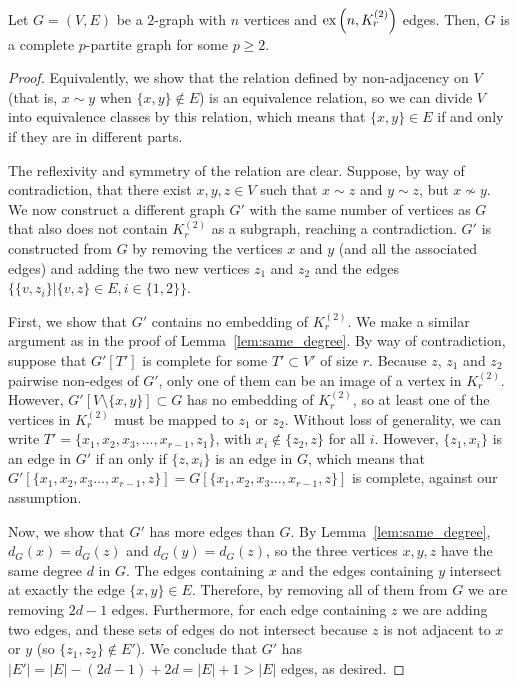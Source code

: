 \begin{lemma} \label{lem:turan_complete_partite}
    Let $G = (V, E)$ be a $2$-graph with $n$ vertices and
    $\text{ex} \left( n, K^{(2)}_{r} \right)$ edges.
    Then, $G$ is a complete $p$-partite graph for some $p \geq 2$.
    \begin{proof}
        Equivalently, we show that the relation defined by non-adjacency on $V$ (that is, $x \sim y$ when
        $\{x, y\} \notin E$) is an equivalence relation, so we can divide $V$ into equivalence classes
        by this relation, which means that $\{x, y\} \in E$ if and only if they are in different parts.

        The reflexivity and symmetry of the relation are clear.
        Suppose, by way of contradiction, that there exist $x, y, z \in V$ such that
        $x \sim z$ and $y \sim z$, but $x \nsim y$.
        We now construct a different graph $G'$ with the same number of vertices as $G$
        that also does not contain $K_r^{(2)}$ as a subgraph, reaching a contradiction.
        $G'$ is constructed from $G$ by removing the vertices
        $x$ and $y$ (and all the associated edges) and adding the two new vertices
        $z_1$ and $z_2$ and the edges $\{\{v, z_i\} | \{v, z\} \in E, i \in \{1, 2\}\}$.

        First, we show that $G'$ contains no embedding of $K_r^{(2)}$.
        We make a similar argument as in the proof of Lemma~\ref{lem:same_degree}.
        By way of contradiction, suppose that $G'[T']$ is complete for some $T' \subset V'$ of size $r$.
        Because $z$, $z_1$ and $z_2$ pairwise non-edges of $G'$, only one of them can be
        an image of a vertex in $K_r^{(2)}$.
        However, $G'[V \setminus \{x, y\}] \subset G$ has no embedding of $K_r^{(2)}$,
        so at least one of the vertices in $K_r^{(2)}$ must be mapped to $z_1$ or $z_2$.
        Without loss of generality, we can write $T' = \{x_1, x_2, x_3, \dots, x_{r-1}, z_1\}$,
        with $x_i \notin \{z_2, z\}$ for all $i$.
        However, $\{z_1, x_i\}$ is an edge in $G'$ if an only if $\{z, x_i\}$ is an edge in $G$,
        which means that $G'[\{x_1, x_2, x_3 \dots, x_{r-1}, z\}] = G[\{x_1, x_2, x_3 \dots, x_{r-1}, z\}]$ is complete,
        against our assumption.

        Now, we show that $G'$ has more edges than $G$.
        By Lemma~\ref{lem:same_degree}, $d_G(x) = d_G(z)$ and $d_G(y) = d_G(z)$,
        so the three vertices $x, y, z$ have the same degree $d$ in $G$.
        The edges containing $x$ and the edges containing $y$ intersect at exactly the edge $\{x, y\} \in E$.
        Therefore, by removing all of them from $G$ we are removing $2d - 1$ edges.
        Furthermore, for each edge containing $z$ we are adding two edges,
        and these sets of edges do not intersect because $z$ is not adjacent to $x$ or $y$ (so $\{z_1, z_2\} \notin E'$).
        We conclude that $G'$ has $|E'| = |E| - (2d - 1) + 2d = |E| + 1 > |E| $ edges, as desired.
    \end{proof}
\end{lemma}

